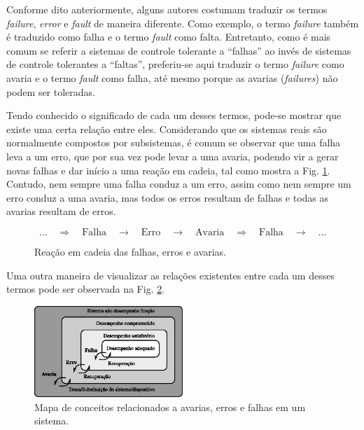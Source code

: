 Conforme dito anteriormente, alguns autores costumam traduzir os termos {\it
failure}, {\it error} e {\it fault} de maneira diferente. Como exemplo, o termo
{\it failure} também é traduzido como falha e o termo {\it fault} como falta.
Entretanto, como é mais comum se referir a sistemas de controle tolerante a
``falhas'' ao invés de sistemas de controle tolerantes a ``faltas'', preferiu-se
aqui traduzir o termo {\it failure} como avaria e o termo {\it fault} como
falha, até mesmo porque as avarias ({\it failures}) não podem ser toleradas.

Tendo conhecido o significado de cada um desses termos, pode-se mostrar que
existe uma certa relação entre eles. Considerando que os sistemas reais são
normalmente compostos por subsistemas, é comum se observar que uma falha leva a
um erro, que por sua vez pode levar a uma avaria, podendo vir a gerar novas
falhas e dar início a uma reação em cadeia, tal como mostra a Fig.
\ref{fig:reacao_cadeia}. Contudo, nem sempre uma falha conduz a um erro, assim
como nem sempre um erro conduz a uma avaria, mas todos os erros resultam de
falhas e todas as avarias resultam de erros.

\begin{figure}[htb]
\centering
\[
\ldots
\quad\Longrightarrow\quad
\text{Falha} 
\quad\longrightarrow\quad
\text{Erro}
\quad\longrightarrow\quad
\text{Avaria}
\quad\Longrightarrow\quad
\text{Falha}
\quad\longrightarrow\quad
\ldots
\]
    \caption{Reação em cadeia das falhas, erros e avarias.}
    \label{fig:reacao_cadeia}
\end{figure}

Uma outra maneira de visualizar as relações existentes entre cada um desses
termos pode ser observada na Fig. \ref{fig:mapa_conceitos}.

\begin{figure}[htb]
\centering
    \includegraphics[width=0.5\textwidth]{imgs/detec_diag/eps/mapa_conceitos}
    \caption{Mapa de conceitos relacionados a avarias, erros e falhas em um
             sistema.}
    \label{fig:mapa_conceitos}
\end{figure}

